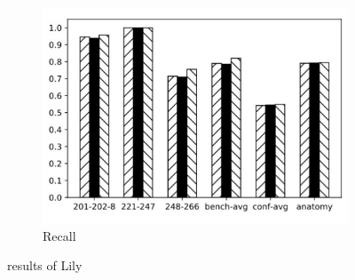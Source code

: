 \documentclass[twoside]{article}
\begin{document}
\begin{figure}[htb!]
\begin{subfigure}{0.3\textwidth}
\label{fig:MultiRegress_Lily_P}
\end{subfigure}
\begin{subfigure}{0.3\textwidth}
	\centering
\includegraphics[width=\textwidth]{data_figs/MulRegress_Lily_R.pdf}
\caption{Recall}
\label{fig:MultiRegress_Lily_R}
\end{subfigure}
\caption{results of Lily}
\end{figure}

\end{document}
